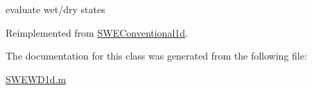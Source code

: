 evaluate wet/dry states 



Reimplemented from \hyperlink{class_s_w_e_conventional1d_ab27cfc5d7b7c7489425cb1cddd1bce16}{S\+W\+E\+Conventional1d}.



The documentation for this class was generated from the following file\+:\begin{DoxyCompactItemize}
\item 
\hyperlink{_s_w_e_w_d1d_8m}{S\+W\+E\+W\+D1d.\+m}\end{DoxyCompactItemize}
